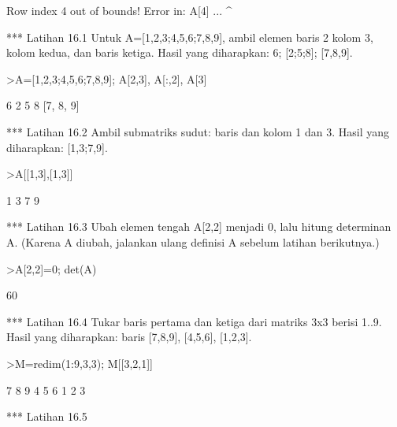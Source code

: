 \documentclass[a4paper,10pt]{article}
\begin{document}
\begin{eulernotebook}
\begin{eulercomment}
\begin{eulercomment}
\begin{eulercomment}
\begin{eulercomment}
\begin{eulercomment}
\begin{eulercomment}
\begin{eulercomment}
\begin{eulercomment}
\begin{eulercomment}
\begin{eulercomment}
\begin{eulercomment}
\begin{eulercomment}
\begin{eulercomment}
\begin{eulercomment}
\begin{eulercomment}
\begin{eulercomment}
\begin{eulercomment}
\begin{eulercomment}
\begin{euleroutput}
  Row index 4 out of bounds!
  Error in:
  A[4] ...
      ^
\end{euleroutput}
\begin{eulercomment}
*** Latihan 16.1
Untuk A=[1,2,3;4,5,6;7,8,9], ambil elemen baris 2 kolom 3, kolom kedua,
dan baris ketiga.
Hasil yang diharapkan: 6; [2;5;8]; [7,8,9].
\end{eulercomment}
\begin{eulerprompt}
>A=[1,2,3;4,5,6;7,8,9]; A[2,3], A[:,2], A[3]
\end{eulerprompt}
\begin{euleroutput}
  6
              2 
              5 
              8 
  [7,  8,  9]
\end{euleroutput}
\begin{eulercomment}
*** Latihan 16.2
Ambil submatriks sudut: baris dan kolom 1 dan 3.
Hasil yang diharapkan: [1,3;7,9].
\end{eulercomment}
\begin{eulerprompt}
>A[[1,3],[1,3]]
\end{eulerprompt}
\begin{euleroutput}
              1             3 
              7             9 
\end{euleroutput}
\begin{eulercomment}
*** Latihan 16.3
Ubah elemen tengah A[2,2] menjadi 0, lalu hitung determinan A. (Karena A
diubah, jalankan ulang definisi A sebelum latihan berikutnya.)
\end{eulercomment}
\begin{eulerprompt}
>A[2,2]=0; det(A)
\end{eulerprompt}
\begin{euleroutput}
  60
\end{euleroutput}
\begin{eulercomment}
*** Latihan 16.4
Tukar baris pertama dan ketiga dari matriks 3x3 berisi 1..9.
Hasil yang diharapkan: baris [7,8,9], [4,5,6], [1,2,3].
\end{eulercomment}
\begin{eulerprompt}
>M=redim(1:9,3,3); M[[3,2,1]]
\end{eulerprompt}
\begin{euleroutput}
              7             8             9 
              4             5             6 
              1             2             3 
\end{euleroutput}
\begin{eulercomment}
*** Latihan 16.5

\end{eulercomment}
\end{eulercomment}
\end{eulercomment}
\end{eulercomment}
\end{eulercomment}
\end{eulercomment}
\end{eulercomment}
\end{eulercomment}
\end{eulercomment}
\end{eulercomment}
\end{eulercomment}
\end{eulercomment}
\end{eulercomment}
\end{eulercomment}
\end{eulercomment}
\end{eulercomment}
\end{eulercomment}
\end{eulercomment}
\end{eulercomment}
\end{eulernotebook}
\end{document}
